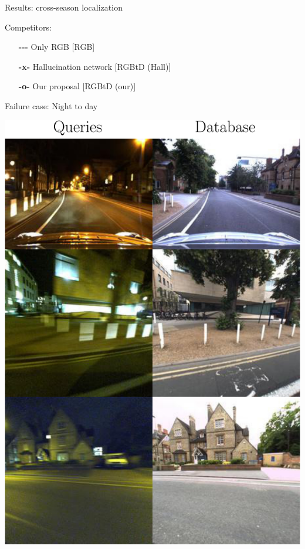 \begin{frame}{Results: cross-season localization}
\begin{minipage}{0.2\linewidth}
			\vspace{0.5cm}	
			{\scriptsize
			Competitors:
			\begin{itemize}
				\item[\textbf{-{}-{}-}] Only RGB [RGB]
				\item[\textbf{-x-}] Hallucination network [RGBtD (Hall)]
				\item[\textbf{-o-}] Our proposal [RGBtD (our)]
			\end{itemize}
			}
	\end{minipage}
\end{frame}

\begin{frame}{Failure case: Night to day}
	\begin{minipage}{0.27\linewidth}
			\includegraphics[width=\linewidth]{vect/res/dataset/night_ex}
			\vfill


\end{minipage}
\end{frame}
